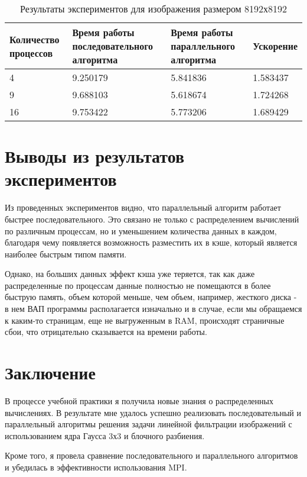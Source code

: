 \documentclass{report}
\begin{document}
\begin{table}[!h]
\caption{Результаты экспериментов для изображения размером 8192х8192}
\centering
\begin{tabular}{| p{2cm} | p{3cm} | p{4cm} | p{2cm} |}
\hline
Количество процессов & Время работы последовательного алгоритма & Время работы параллельного алгоритма & Ускорение  \\[5pt]
\hline
4        & 9.250179        & 5.841836     & 1.583437       \\
9        & 9.688103        & 5.618674     & 1.724268       \\
16       & 9.753422        & 5.773206     & 1.689429       \\
\hline
\end{tabular}
\end{table}

\newpage

\section*{Выводы из результатов экспериментов}
Из проведенных экспериментов видно, что параллельный алгоритм работает быстрее последовательного. Это связано не только с распределением вычислений по различным процессам, но и уменьшением количества данных в каждом, благодаря чему появляется возможность разместить их в кэше, который является наиболее быстрым типом памяти. 
\par Однако, на больших данных эффект кэша уже теряется, так как даже распределенные по процессам данные полностью не помещаются в более быструю память, объем которой меньше, чем объем, например, жесткого диска - в нем ВАП программы располагается изначально и в случае, если мы обращаемся к каким-то страницам, еще не выгруженным в RAM, происходят страничные сбои, что отрицательно сказывается на времени работы.

\newpage

\section*{Заключение}
В процессе учебной практики я получила новые знания о распределенных вычислениях. В результате мне удалось успешно реализовать последовательный и параллельный алгоритмы решения задачи линейной фильтрации изображений с использованием ядра Гаусса 3х3 и блочного разбиения. 
\par Кроме того, я провела сравнение последовательного и параллельного алгоритмов и убедилась в эффективности использования MPI.
\end{document}
